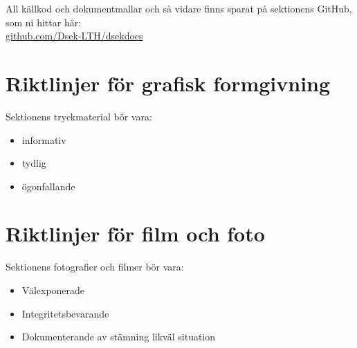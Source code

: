 \documentclass[]{dsekprotokoll}
\begin{document}
All källkod och dokumentmallar och så vidare finns sparat på
sektionens GitHub, som ni hittar här: \\
\href{https://github.com/Dsek-LTH/dsekdocs}{github.com/Dsek-LTH/dsekdocs}

\section{Riktlinjer för grafisk formgivning}
Sektionens tryckmaterial bör vara:
\begin{itemize}
  \item informativ
  \item tydlig
  \item ögonfallande
\end{itemize}

\section{Riktlinjer för film och foto}
Sektionens fotografier och filmer bör vara:
\begin{itemize}
  \item Välexponerade
  \item Integritetsbevarande
  \item Dokumenterande av stämning likväl situation
\end{itemize}



\end{document}
